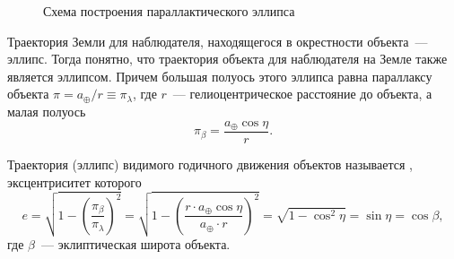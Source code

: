 \begin{wrapfigure}[10]{r}{0.47\tw}
    \caption{Схема построения параллактического эллипса}
    \label{pic:parallax-ellipse}
\end{wrapfigure}
Траектория Земли для наблюдателя, находящегося в окрестности объекта~--- эллипс. Тогда понятно, что траектория объекта для наблюдателя на Земле также является эллипсом. Причем большая полуось этого эллипса равна параллаксу объекта $\pi = a_\oplus / r \equiv \pi_\lambda$, где $r$~--- гелиоцентрическое расстояние до объекта, а малая полуось
\begin{equation*}
    \pi_\beta = \frac{a_\oplus \cos \eta}{r}.
\end{equation*}

Траектория (эллипс) видимого годичного движения объектов называется , эксцентриситет которого
\begin{equation*}
    e
    = \sqrt{1 - \left(\frac{\pi_\beta}{\pi_\lambda} \right)^2}
    = \sqrt{1 - \left( \frac{r \cdot a_\oplus \cos \eta}{a_\oplus \cdot r}\right)^2}
    = \sqrt{1 - \cos^2 \eta} = \sin \eta = \cos \beta,
\end{equation*}
где $\beta$~--- эклиптическая широта объекта.

